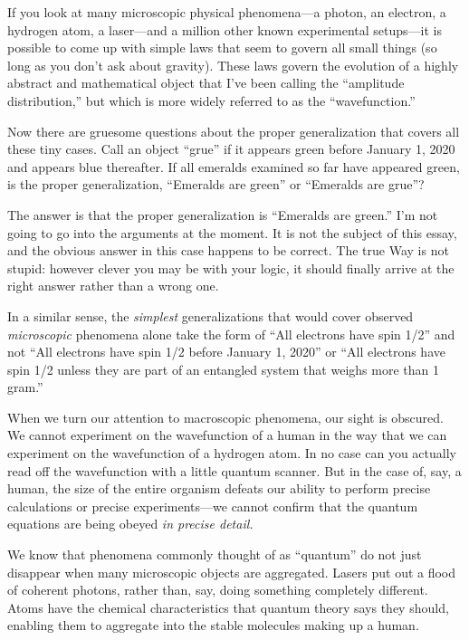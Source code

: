 {
 If you look at many microscopic physical phenomena---a photon, an
electron, a hydrogen atom, a laser---and a million other known
experimental setups---it is possible to come up with simple laws that
seem to govern all small things (so long as you don't
ask about gravity). These laws govern the evolution of a highly
abstract and mathematical object that I've been calling
the ``amplitude distribution,'' but
which is more widely referred to as the
``wavefunction.'' }

{
 Now there are gruesome questions about the proper generalization
that covers all these tiny cases. Call an object
``grue'' if it appears green before
January 1, 2020 and appears blue thereafter. If all emeralds examined
so far have appeared green, is the proper generalization,
``Emeralds are green'' or
``Emeralds are grue''?}

{
 The answer is that the proper generalization is
``Emeralds are green.''
I'm not going to go into the arguments at the moment.
It is not the subject of this essay, and the obvious answer in this
case happens to be correct. The true Way is not stupid: however clever
you may be with your logic, it should finally arrive at the right
answer rather than a wrong one.}

{
 In a similar sense, the \textit{simplest} generalizations that
would cover observed \textit{microscopic} phenomena alone take the form
of ``All electrons have spin 1/2''
and not ``All electrons have spin 1/2 before January
1, 2020'' or ``All electrons have
spin 1/2 unless they are part of an entangled system that weighs more
than 1 gram.''}

{
 When we turn our attention to macroscopic phenomena, our sight is
obscured. We cannot experiment on the wavefunction of a human in the
way that we can experiment on the wavefunction of a hydrogen atom. In
no case can you actually read off the wavefunction with a little
quantum scanner. But in the case of, say, a human, the size of the
entire organism defeats our ability to perform precise calculations or
precise experiments---we cannot confirm that the quantum equations are
being obeyed \textit{in precise detail.}}

{
 We know that phenomena commonly thought of as
``quantum'' do not just disappear
when many microscopic objects are aggregated. Lasers put out a flood of
coherent photons, rather than, say, doing something completely
different. Atoms have the chemical characteristics that quantum theory
says they should, enabling them to aggregate into the stable molecules
making up a human.}

